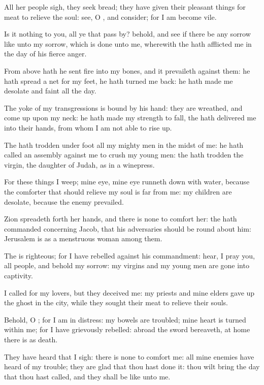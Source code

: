 \verse All her people sigh, they seek bread; they have given their pleasant things for meat to relieve the soul: see, O \LORD, and consider; for I am become vile.

\verse Is it nothing to you, all ye that pass by? behold, and see if there be any sorrow like unto my sorrow, which is done unto me, wherewith the \LORD hath afflicted me in the day of his fierce anger.

\verse From above hath he sent fire into my bones, and it prevaileth against them: he hath spread a net for my feet, he hath turned me back: he hath made me desolate and faint all the day.

\verse The yoke of my transgressions is bound by his hand: they are wreathed, and come up upon my neck: he hath made my strength to fall, the \LORD hath delivered me into their hands, from whom I am not able to rise up.

\verse The \LORD hath trodden under foot all my mighty men in the midst of me: he hath called an assembly against me to crush my young men: the \LORD hath trodden the virgin, the daughter of Judah, as in a winepress.

\verse For these things I weep; mine eye, mine eye runneth down with water, because the comforter that should relieve my soul is far from me: my children are desolate, because the enemy prevailed.

\verse Zion spreadeth forth her hands, and there is none to comfort her: the \LORD hath commanded concerning Jacob, that his adversaries should be round about him: Jerusalem is as a menstruous woman among them.

\verse The \LORD is righteous; for I have rebelled against his commandment: hear, I pray you, all people, and behold my sorrow: my virgins and my young men are gone into captivity.

\verse I called for my lovers, but they deceived me: my priests and mine elders gave up the ghost in the city, while they sought their meat to relieve their souls.

\verse Behold, O \LORD; for I am in distress: my bowels are troubled; mine heart is turned within me; for I have grievously rebelled: abroad the sword bereaveth, at home there is as death.

\verse They have heard that I sigh: there is none to comfort me: all mine enemies have heard of my trouble; they are glad that thou hast done it: thou wilt bring the day that thou hast called, and they shall be like unto me.

